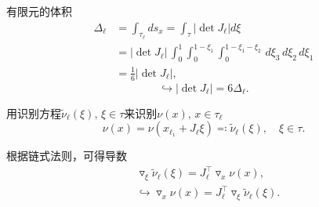 有限元的体积
\begin{equation*}
  \begin{split}
  \Delta_{\ell} & = \int_{\tau_{\ell}} d s_{x}
  = \int_{\tau} \left| \det J_{\ell} \right| d \xi \\
  & = \left| \det J_{\ell} \right| \,
  \int_{0}^{1} \int_{0}^{1 - \xi_{1}} \int_{0}^{1 - \xi_{1} - \xi_{2}} \, d \xi_{3} \, d \xi_{2} \, d \xi_{1} \\
  & = \frac{1}{6} \left| \det J_{\ell} \right|,
\end{split}
\end{equation*}
\begin{equation}
  \label{eq:finele-ref-d3-volume-matrix-determinant}
  \hookrightarrow \left| \det J_{\ell} \right| = 6 \Delta_{\ell}.
\end{equation}

用识别方程$\widetilde{\nu}_{\ell}(\xi), \, \xi \in \tau$来识别$\nu(x), \, x \in \tau_{\ell}$
\begin{equation*}
  \nu(x) = \nu \left( x_{\ell_{1}} + J_{\ell} \xi \right)
  \eqqcolon \widetilde{\nu}_{\ell}(\xi), \quad \xi \in \tau.
\end{equation*}

根据链式法则，可得导数
\begin{equation*}
  \begin{split}
    & \triangledown_{\xi} \widetilde{\nu}_{\ell} (\xi) = J_{\ell}^{\top} \triangledown_{x} \nu(x), \\
    & \hookrightarrow \triangledown_{x} \nu(x) = J_{\ell}^{\top} \triangledown_{\xi} \widetilde{\nu}_{\ell} (\xi).
  \end{split}
\end{equation*}

